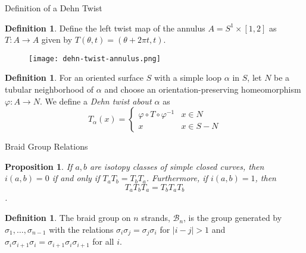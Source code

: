 \documentclass{beamer}
\newtheorem{prop}[thm]{Proposition}
\theoremstyle{definition}
\newtheorem{df}[thm]{Definition}
\theoremstyle{remark}
\begin{document}
\begin{frame}{Definition of a Dehn Twist}

\begin{df}
    Define the left twist map
    of the annulus $A = S^1 \times
    [1,2]$ as
    $T \colon A \to A$ given by
    $T(\theta, t) = 
    (\theta + 2 \pi t, t)$.
\end{df}

    \begin{figure}
        \centering \texttt{[image: dehn-twist-annulus.png]}
        \label{fig:enter-label}
    \end{figure}    
    \begin{df}
        For an oriented surface $S$
        with a simple loop $\alpha$
        in $S$, let
        $N$ be a tubular neighborhood
        of $\alpha$ and choose
        an orientation-preserving
        homeomorphism 
        $\varphi \colon A \to N$.
        We define a \textit{Dehn twist about $\alpha$} as
        \[T_{\alpha} (x)
        = 
        \begin{cases}
            \varphi \circ T \circ
            \varphi^{-1}& x \in N\\
            x& x \in S - N
        \end{cases}
        \]
    \end{df}
\end{frame}

\begin{frame}{Braid Group Relations}
    \begin{prop}
        If $a,b$ are isotopy classes
        of simple closed curves, then
        $i(a,b) = 0$ if and only if
        $T_a T_b = T_b T_a$. 
        Furthermore, if
        $i (a,b) = 1$, then
        \[T_a T_b T_a = 
        T_b T_a T_b\].
    \end{prop}

\begin{df}
    The braid group on
    $n$ strands, $\mathcal{B}_n$, is
    the group generated by $\sigma_1,
    \ldots, \sigma_{n-1}$
    with the relations $\sigma_i \sigma_j = \sigma_j \sigma_i$ for
    $|i-j| > 1$ and 
    $\sigma_i \sigma_{i+1} \sigma_i 
    = \sigma_{i+1} \sigma_i \sigma_{i+1}$
    for all $i$.
\end{df}
\end{frame}
\end{document}
